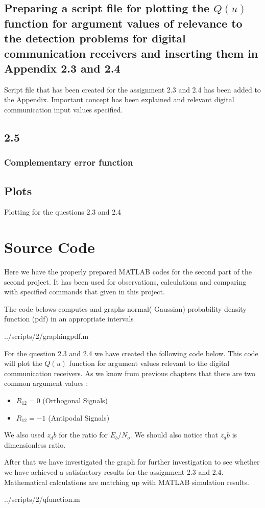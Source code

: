 \subsection{Preparing a script file for plotting the $Q(u)$ function for argument values of relevance to the detection problems for digital communication receivers and inserting them in Appendix 2.3 and 2.4 }
Script file that has been created for the assignment 2.3 and 2.4 has been added to the Appendix. Important concept has been explained and relevant digital communication input values specified.
\subsection{2.5}





\subsubsection{Complementary error function}



\subsection{Plots}
Plotting for the questions 2.3 and 2.4
\section{Source Code}
Here we have the properly prepared MATLAB codes for the second part of the second project. It has been used for observations, calculations and comparing with specified commands that given in this project.

The code belows computes and graphs normal( Gaussian) probability density function (pdf) in an appropriate intervals

\begin{lstinputlisting}[language=Octave]{../scripts/2/graphingpdf.m}
\end{lstinputlisting}


For the question 2.3 and 2.4 we have created the following code below. This code will plot the $Q(u)$ function for argument values relevant to the digital communication receivers. As we know from previous chapters that there are two common argument values :
\begin{itemize}
	\item $R_12=0 $ (Orthogonal Signals) 
	\item $R_12=-1$ (Antipodal Signals)
\end{itemize}
We also used $z_db$ for the ratio for $E_b/N_o$. We should also notice that $z_db$ is dimensionless ratio.

After that we have investigated the graph for further investigation to see whether we have achieved a satisfactory results for the assignment 2.3 and 2.4. Mathematical calculations are matching up with MATLAB simulation results.

\begin{lstinputlisting}[language=Octave]{../scripts/2/qfunction.m}
\end{lstinputlisting}
